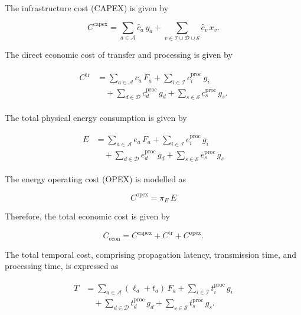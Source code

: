 \documentclass[a4paper,fleqn]{cas-dc}
\newcommand{\A}{\mathcal{A}}
\newcommand{\Iset}{\mathcal{I}}
\newcommand{\Dset}{\mathcal{D}}
\newcommand{\Sset}{\mathcal{S}}
\begin{document}
The infrastructure cost (CAPEX) is given by

\begin{equation}
C^{\mathrm{capex}}
= \sum_{a\in\A} \hat c_a\,y_a
+ \sum_{v\in\Iset\cup\Dset\cup\Sset} \hat c_v\,x_v.
\end{equation}

The direct economic cost of transfer and processing is given by

\begin{align}
\begin{split}
C^{\mathrm{tr}}
&= \sum_{a\in\A} c_a\,F_a
+ \sum_{i\in\Iset} c_i^{\mathrm{proc}}\,g_i \\
&\quad + \sum_{d\in\Dset} c_d^{\mathrm{proc}}\,g_d
+ \sum_{s\in\Sset} c_s^{\mathrm{proc}}\,g_s.
\end{split}
\end{align}


The total physical energy consumption is given by

\begin{align}
\begin{split}
E
&= \sum_{a\in\A} e_a\,F_a
+ \sum_{i\in\Iset} e_i^{\mathrm{proc}}\,g_i \\
&\quad + \sum_{d\in\Dset} e_d^{\mathrm{proc}}\,g_d
+ \sum_{s\in\Sset} e_s^{\mathrm{proc}}\,g_s
\end{split}
\end{align}

The energy operating cost (OPEX) is modelled as


\begin{equation}
C^{\mathrm{opex}} = \pi_E\,E
\end{equation}

Therefore, the total economic cost is given by

\begin{equation}
\label{ref:econ}
C_{\mathrm{econ}} = C^{\mathrm{capex}} + C^{\mathrm{tr}} + C^{\mathrm{opex}}.
\end{equation}

The total temporal cost, comprising propagation latency, transmission time, and processing time, is expressed as

\begin{align}
\begin{split}
T
&= \sum_{a\in\A} (\ell_a+t_a)\,F_a
+ \sum_{i\in\Iset} t_i^{\mathrm{proc}}\,g_i \\
&\quad + \sum_{d\in\Dset} t_d^{\mathrm{proc}}\,g_d
+ \sum_{s\in\Sset} t_s^{\mathrm{proc}}\,g_s.
\end{split}
\end{align}
\end{document}
